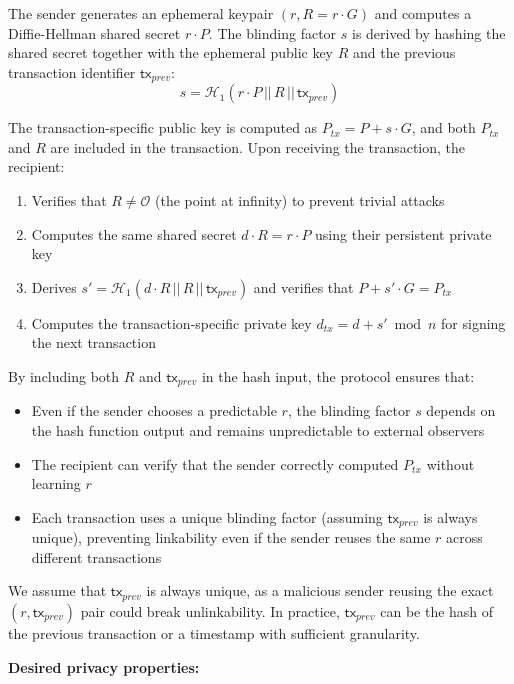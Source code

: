 \documentclass{article}
\begin{document}
The sender generates an ephemeral keypair $(r, R = r \cdot G)$ and computes a Diffie-Hellman shared secret $r \cdot P$. The blinding factor $s$ is derived by hashing the shared secret together with the ephemeral public key $R$ and the previous transaction identifier $\mathsf{tx}_{prev}$:
$$s = \mathcal{H}_1(r \cdot P \,||\, R \,||\, \mathsf{tx}_{prev})$$

The transaction-specific public key is computed as $P_{tx} = P + s \cdot G$, and both $P_{tx}$ and $R$ are included in the transaction. Upon receiving the transaction, the recipient:
\begin{enumerate}
\item Verifies that $R \neq \mathcal{O}$ (the point at infinity) to prevent trivial attacks
\item Computes the same shared secret $d \cdot R = r \cdot P$ using their persistent private key
\item Derives $s' = \mathcal{H}_1(d \cdot R \,||\, R \,||\, \mathsf{tx}_{prev})$ and verifies that $P + s' \cdot G = P_{tx}$
\item Computes the transaction-specific private key $d_{tx} = d + s' \bmod n$ for signing the next transaction
\end{enumerate}

By including both $R$ and $\mathsf{tx}_{prev}$ in the hash input, the protocol ensures that:
\begin{itemize}
\item Even if the sender chooses a predictable $r$, the blinding factor $s$ depends on the hash function output and remains unpredictable to external observers
\item The recipient can verify that the sender correctly computed $P_{tx}$ without learning $r$
\item Each transaction uses a unique blinding factor (assuming $\mathsf{tx}_{prev}$ is always unique), preventing linkability even if the sender reuses the same $r$ across different transactions
\end{itemize}

We assume that $\mathsf{tx}_{prev}$ is always unique, as a malicious sender reusing the exact $(r, \mathsf{tx}_{prev})$ pair could break unlinkability. In practice, $\mathsf{tx}_{prev}$ can be the hash of the previous transaction or a timestamp with sufficient granularity.


\textbf{Desired privacy properties:}
\end{document}
